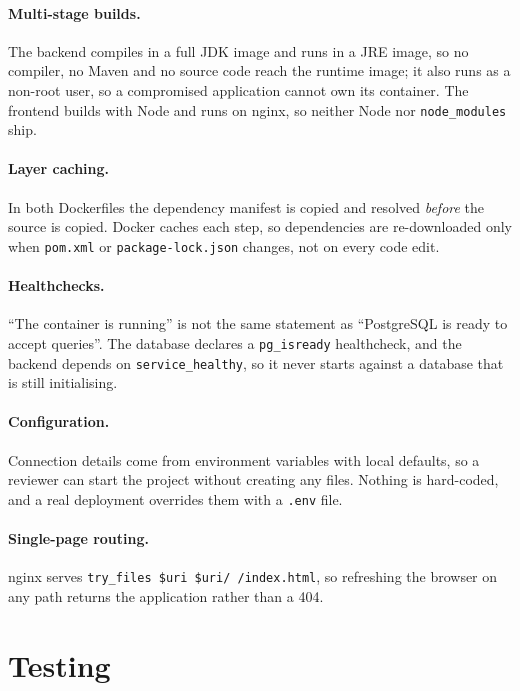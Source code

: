 \documentclass[11pt,a4paper]{article}
\begin{document}
\paragraph{Multi-stage builds.} The backend compiles in a full JDK image and runs in a JRE image,
so no compiler, no Maven and no source code reach the runtime image; it also runs as a non-root
user, so a compromised application cannot own its container. The frontend builds with Node and runs
on nginx, so neither Node nor \texttt{node\_modules} ship.

\paragraph{Layer caching.} In both Dockerfiles the dependency manifest is copied and resolved
\emph{before} the source is copied. Docker caches each step, so dependencies are re-downloaded only
when \texttt{pom.xml} or \texttt{package-lock.json} changes, not on every code edit.

\paragraph{Healthchecks.} ``The container is running'' is not the same statement as ``PostgreSQL is
ready to accept queries''. The database declares a \texttt{pg\_isready} healthcheck, and the
backend depends on \texttt{service\_healthy}, so it never starts against a database that is still
initialising.

\paragraph{Configuration.} Connection details come from environment variables with local defaults,
so a reviewer can start the project without creating any files. Nothing is hard-coded, and a real
deployment overrides them with a \texttt{.env} file.

\paragraph{Single-page routing.} nginx serves \texttt{try\_files \$uri \$uri/ /index.html}, so
refreshing the browser on any path returns the application rather than a 404.

\section{Testing}
\end{document}

